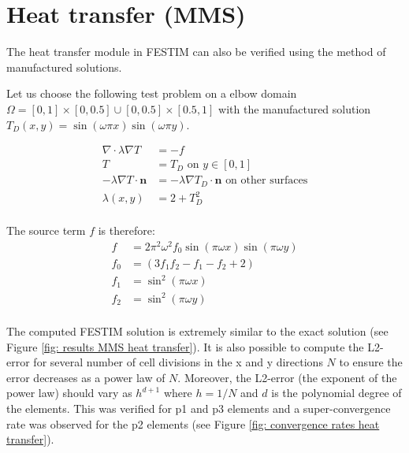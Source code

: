 \section{Heat transfer (MMS)}


The heat transfer module in FESTIM can also be verified using the method of manufactured solutions.

Let us choose the following test problem on a elbow domain $\Omega = [0, 1] \times [0, 0.5] \cup [0, 0.5] \times [0.5, 1]$ with the manufactured solution $T_D(x, y) = \sin(\omega \pi x) \sin(\omega \pi y)$.

\begin{align}
    \nabla \cdot \lambda \nabla T &= -f \\
    T &= T_D \text{  on  } y \in [0, 1] \\
    -\lambda \nabla T \cdot \mathbf{n} &= -\lambda \nabla T_D \cdot \mathbf{n} \text{  on  other surfaces} \\
    \lambda(x, y) &= 2 + T_D^2 \\
\end{align}

The source term $f$ is therefore:
\begin{align}
    f &= 2 \pi^{2} \omega^{2} f_0 \sin{\left (\pi \omega x \right )} \sin{\left (\pi \omega y \right )} \\
    f_0 &= \left(3 f_1 f_2 - f_1 - f_2 + 2\right) \\
    f_1 &= \sin^{2}{\left (\pi \omega x \right )} \\
    f_2 &= \sin^{2}{\left (\pi \omega y \right )} \\
\end{align}

The computed FESTIM solution is extremely similar to the exact solution (see Figure \ref{fig: results MMS heat transfer}).
It is also possible to compute the L2-error for several number of cell divisions in the x and y directions $N$ to ensure the error decreases as a power law of $N$.
Moreover, the L2-error (the exponent of the power law) should vary as $h^{d+1}$ where $h=1/N$ and $d$ is the polynomial degree of the elements.
This was verified for \gls{p1} and \gls{p3} elements and a super-convergence rate was observed for the \gls{p2} elements (see Figure \ref{fig: convergence rates heat transfer}).

